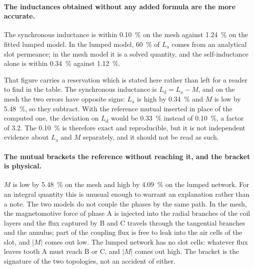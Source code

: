 \documentclass[10pt,a4paper,twocolumn]{article}
\theoremstyle{plain}
\theoremstyle{remark}
\begin{document}
\paragraph{The inductances obtained without any added formula are the
more accurate.}
The synchronous inductance is within \SI{0.10}{\percent} on the mesh
against \SI{1.24}{\percent} on the fitted lumped model. In the lumped
model, \SI{60}{\percent} of $L_{\mathrm{a}}$ comes from an analytical
slot permeance; in the mesh model it is a solved quantity, and the
self-inductance alone is within \SI{0.34}{\percent} against
\SI{1.12}{\percent}.

That figure carries a reservation which is stated here rather than left
for a reader to find in the table. The synchronous inductance is
$L_{\mathrm{d}}=L_{\mathrm{a}}-M$, and on the mesh the two errors have
opposite signs: $L_{\mathrm{a}}$ is high by \SI{0.34}{\percent} and $M$
is low by \SI{5.48}{\percent}, so they subtract. With the reference
mutual inserted in place of the computed one, the deviation on
$L_{\mathrm{d}}$ would be \SI{0.33}{\percent} instead of
\SI{0.10}{\percent}, a factor of \num{3.2}. The
\SI{0.10}{\percent} is therefore exact and reproducible, but it is not
independent evidence about $L_{\mathrm{a}}$ and $M$ separately, and it
should not be read as such.

\paragraph{The mutual brackets the reference without reaching it, and
the bracket is physical.}
$M$ is low by \SI{5.48}{\percent} on the mesh and high by
\SI{4.09}{\percent} on the lumped network. For an integral quantity this
is unusual enough to warrant an explanation rather than a note. The two
models do not couple the phases by the same path. In the mesh, the
magnetomotive force of phase A is injected into the radial branches of
the coil layers and the flux captured by B and C travels through the
tangential branches and the annulus; part of the coupling flux is free
to leak into the air cells of the slot, and $|M|$ comes out low. The
lumped network has no slot cells: whatever flux leaves tooth A must
reach B or C, and $|M|$ comes out high. The bracket is the signature of
the two topologies, not an accident of either.
\end{document}
